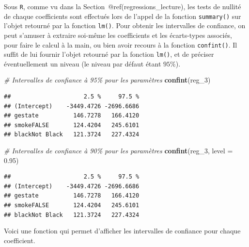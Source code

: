 \documentclass[
  11pt,
]{book}
\newenvironment{Shaded}{\begin{snugshade}}{\end{snugshade}}
\newcommand{\CommentTok}[1]{\textcolor[rgb]{0.56,0.35,0.01}{\textit{#1}}}
\newcommand{\DataTypeTok}[1]{\textcolor[rgb]{0.13,0.29,0.53}{#1}}
\newcommand{\DecValTok}[1]{\textcolor[rgb]{0.00,0.00,0.81}{#1}}
\newcommand{\FloatTok}[1]{\textcolor[rgb]{0.00,0.00,0.81}{#1}}
\newcommand{\KeywordTok}[1]{\textcolor[rgb]{0.13,0.29,0.53}{\textbf{#1}}}
\newcommand{\NormalTok}[1]{#1}
\numberwithin{equation}{section}
\numberwithin{countremarque}{section}
\begin{document}
Sous \texttt{R}, comme vu dans la Section~@ref(regressions\_lecture), les tests de nullité de chaque coefficients sont effectués lors de l'appel de la fonction \texttt{summary()} sur l'objet retourné par la fonction \texttt{lm()}. Pour obtenir les intervalles de confiance, on peut s'amuser à extraire soi-même les coefficients et les écarts-types associés, pour faire le calcul à la main, ou bien avoir recours à la fonction \texttt{confint()}. Il suffit de lui fournir l'objet retourné par la fonction \texttt{lm()}, et de préciser éventuellement un niveau (le niveau par défaut étant \(95\%\)).

\begin{Shaded}
\begin{Highlighting}[]
\CommentTok{\# Intervalles de confiance à 95\% pour les paramètres}
\KeywordTok{confint}\NormalTok{(reg\_}\DecValTok{3}\NormalTok{)}
\end{Highlighting}
\end{Shaded}

\begin{lstlisting}
##                     2.5 %     97.5 %
## (Intercept)    -3449.4726 -2696.6686
## gestate          146.7278   166.4120
## smokeFALSE       124.4204   245.6101
## blackNot Black   121.3724   227.4324
\end{lstlisting}

\begin{Shaded}
\begin{Highlighting}[]
\CommentTok{\# Intervalles de confiance à 90\% pour les paramètres}
\KeywordTok{confint}\NormalTok{(reg\_}\DecValTok{3}\NormalTok{, }\DataTypeTok{level =} \FloatTok{0.95}\NormalTok{)}
\end{Highlighting}
\end{Shaded}

\begin{lstlisting}
##                     2.5 %     97.5 %
## (Intercept)    -3449.4726 -2696.6686
## gestate          146.7278   166.4120
## smokeFALSE       124.4204   245.6101
## blackNot Black   121.3724   227.4324
\end{lstlisting}

Voici une fonction qui permet d'afficher les intervalles de confiance pour chaque coefficient.
\end{document}
